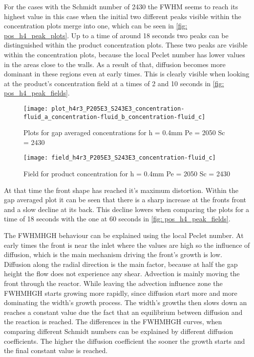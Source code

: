 \documentclass[../thesis.tex]{subfiles}
\begin{document}
For the cases with the Schmidt number of 2430 the FWHM seems to reach its highest value in this case when the initial two different peaks visible within the concentration plots merge into one, which can be seen in \autoref{fig: pos_h4_peak_plots}. Up to a time of around 18 seconds two peaks can be distinguished within the product concentration plots. These two peaks are visible within the concentration plots, because the local Peclet number has lower values in the areas close to the walls. As a result of that, diffusion becomes more dominant in these regions even at early times. This is clearly visible when looking at the product's concentration field at a times of 2 and 10 seconds in \autoref{fig: pos_h4_peak_fields}.

\begin{figure}[htbp]
	\centering
	\texttt{[image: plot\_h4r3\_P205E3\_S243E3\_concentration-fluid\_a\_concentration-fluid\_b\_concentration-fluid\_c]}
	\caption{Plots for gap averaged concentrations for h = 0.4mm Pe = 2050 Sc = 2430}
	\label{fig: pos_h4_peak_plots}
\end{figure}
\begin{figure}[htbp]
	\centering
	\texttt{[image: field\_h4r3\_P205E3\_S243E3\_concentration-fluid\_c]}
	\caption{Field for product concentration for h = 0.4mm Pe = 2050 Sc = 2430}
	\label{fig: pos_h4_peak_fields}
\end{figure}

At that time the front shape has reached it's maximum distortion. Within the gap averaged plot it can be seen that there is a sharp increase at the fronts front and a slow decline at its back. This decline lowers when comparing the plots for a time of 18 seconds with the one at 60 seconds in \autoref{fig: pos_h4_peak_fields}.

The FWHMHGH behaviour can be explained using the local Peclet number. At early times the front is near the inlet where the values are high so the influence of diffusion, which is the main mechanism driving the front's growth is low. Diffusion along the radial direction is the main factor, because at half the gap height the flow does not experience any shear. Advection is mainly moving the front through the reactor. While leaving the advection influence zone the FWHMHGH starts growing more rapidly, since diffusion start more and more dominating the width's growth process. The width's growths then slows down an reaches a constant value due the fact that an equilibrium between diffusion and the reaction is reached. The differences in the FWHMHGH curves, when comparing different Schmidt numbers can be explained by different diffusion coefficients. The higher the diffusion coefficient the sooner the growth starts and the final constant value is reached.
\newpage
\end{document}
